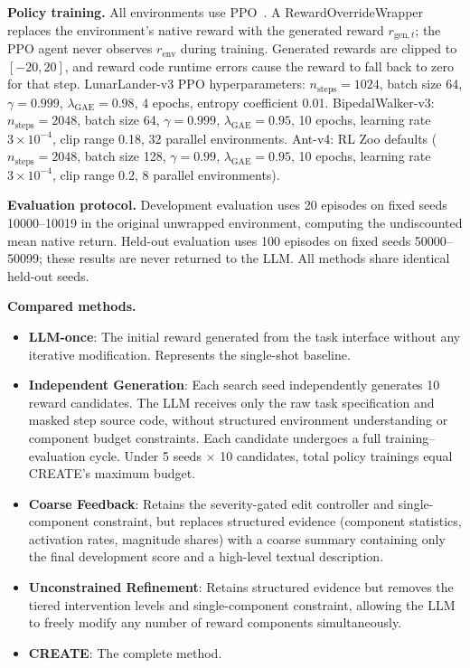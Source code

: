 \documentclass[letterpaper,twocolumn,10pt]{article}
\begin{document}
\textbf{Policy training.} All environments use PPO~\cite{ppo}. A RewardOverrideWrapper replaces the environment's native reward with the generated reward $r_{\text{gen},t}$; the PPO agent never observes $r_{\text{env}}$ during training. Generated rewards are clipped to $[-20, 20]$, and reward code runtime errors cause the reward to fall back to zero for that step. LunarLander-v3 PPO hyperparameters: $n_\text{steps}=1024$, batch size 64, $\gamma=0.999$, $\lambda_\text{GAE}=0.98$, 4 epochs, entropy coefficient 0.01. BipedalWalker-v3: $n_\text{steps}=2048$, batch size 64, $\gamma=0.999$, $\lambda_\text{GAE}=0.95$, 10 epochs, learning rate $3\times10^{-4}$, clip range 0.18, 32 parallel environments. Ant-v4: RL Zoo defaults ($n_\text{steps}=2048$, batch size 128, $\gamma=0.99$, $\lambda_\text{GAE}=0.95$, 10 epochs, learning rate $3\times10^{-4}$, clip range 0.2, 8 parallel environments).

\textbf{Evaluation protocol.} Development evaluation uses 20 episodes on fixed seeds 10000--10019 in the original unwrapped environment, computing the undiscounted mean native return. Held-out evaluation uses 100 episodes on fixed seeds 50000--50099; these results are never returned to the LLM. All methods share identical held-out seeds.

\textbf{Compared methods.}
\begin{itemize}
    \item \textbf{LLM-once}: The initial reward generated from the task interface without any iterative modification. Represents the single-shot baseline.
    \item \textbf{Independent Generation}: Each search seed independently generates 10 reward candidates. The LLM receives only the raw task specification and masked step source code, without structured environment understanding or component budget constraints. Each candidate undergoes a full training--evaluation cycle. Under 5 seeds $\times$ 10 candidates, total policy trainings equal CREATE's maximum budget.
    \item \textbf{Coarse Feedback}: Retains the severity-gated edit controller and single-component constraint, but replaces structured evidence (component statistics, activation rates, magnitude shares) with a coarse summary containing only the final development score and a high-level textual description.
    \item \textbf{Unconstrained Refinement}: Retains structured evidence but removes the tiered intervention levels and single-component constraint, allowing the LLM to freely modify any number of reward components simultaneously.
    \item \textbf{CREATE}: The complete method.
\end{itemize}
\end{document}
